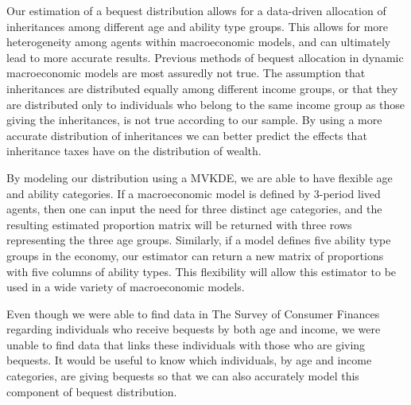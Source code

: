 \documentclass[letterpaper,12pt]{article}
\theoremstyle{definition}
\begin{document}
\begin{spacing}{1.5}
  Our estimation of a bequest distribution allows for a data-driven allocation of inheritances among different age and ability type groups. This allows for more heterogeneity among agents within macroeconomic models, and can ultimately lead to more accurate results. Previous methods of bequest allocation in dynamic macroeconomic models are most assuredly not true. The assumption that inheritances are distributed equally among different income groups, or that they are distributed only to individuals who belong to the same income group as those giving the inheritances, is not true according to our sample. By using a more accurate distribution of inheritances we can better predict the effects that inheritance taxes have on the distribution of wealth.

  By modeling our distribution using a MVKDE, we are able to have flexible age and ability categories. If a macroeconomic model is defined by 3-period lived agents, then one can input the need for three distinct age categories, and the resulting estimated proportion matrix will be returned with three rows representing the three age groups. Similarly, if a model defines five ability type groups in the economy, our estimator can return a new matrix of proportions with five columns of ability types. This flexibility will allow this estimator to be used in a wide variety of macroeconomic models.

  Even though we were able to find data in The Survey of Consumer Finances regarding individuals who receive bequests by both age and income, we were unable to find data that links these individuals with those who are giving bequests. It would be useful to know which individuals, by age and income categories, are giving bequests so that we can also accurately model this component of bequest distribution.



\clearpage


\end{spacing}


\newpage









\end{document}
